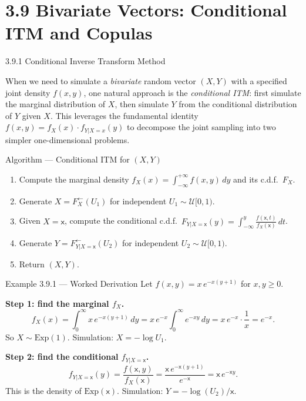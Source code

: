 \documentclass[aspectratio=169,10pt]{beamer}
\newcommand{\UU}{\mathcal{U}}
\begin{document}
\section{3.9 Bivariate Vectors: Conditional ITM and Copulas}

\begin{frame}[allowframebreaks]{3.9.1 Conditional Inverse Transform Method}

When we need to simulate a \emph{bivariate} random vector $(X, Y)$ with a
specified joint density $f(x, y)$, one natural approach is the
\emph{conditional ITM}: first simulate the marginal distribution of $X$,
then simulate $Y$ from the conditional distribution of $Y$ given $X$.
This leverages the fundamental identity
$f(x, y) = f_X(x) \cdot f_{Y|X=x}(y)$ to decompose the joint sampling
into two simpler one-dimensional problems.

\begin{block}{Algorithm --- Conditional ITM for $(X, Y)$}
  \begin{enumerate}
    \item Compute the marginal density $f_X(x) = \int_{-\infty}^{+\infty} f(x,y)\,dy$
          and its c.d.f.\ $F_X$.
    \item Generate $X = F_X^{\leftarrow}(U_1)$ for independent $U_1 \sim \UU[0,1)$.
    \item Given $X = \mathsf{x}$, compute the conditional c.d.f.\
          $F_{Y|X=\mathsf{x}}(y) = \int_{-\infty}^y \frac{f(\mathsf{x},t)}{f_X(\mathsf{x})}\,dt$.
    \item Generate $Y = F_{Y|X=\mathsf{x}}^{\leftarrow}(U_2)$ for independent $U_2 \sim \UU[0,1)$.
    \item Return $(X, Y)$.
  \end{enumerate}
\end{block}

\begin{exampleblock}{Example 3.9.1 --- Worked Derivation}
  Let $f(x, y) = x\,e^{-x(y+1)}$ for $x, y \ge 0$.

  \textbf{Step 1: find the marginal $f_X$.}
  \[
    f_X(x) = \int_0^\infty x\,e^{-x(y+1)}\,dy
    = x\,e^{-x} \int_0^\infty e^{-xy}\,dy
    = x\,e^{-x} \cdot \frac{1}{x} = e^{-x}.
  \]
  So $X \sim \mathrm{Exp}(1)$.  Simulation: $X = -\log U_1$.

  \textbf{Step 2: find the conditional $f_{Y|X=\mathsf{x}}$.}
  \[
    f_{Y|X=\mathsf{x}}(y)
    = \frac{f(\mathsf{x}, y)}{f_X(\mathsf{x})}
    = \frac{\mathsf{x}\,e^{-\mathsf{x}(y+1)}}{e^{-\mathsf{x}}}
    = \mathsf{x}\,e^{-\mathsf{x}y}.
  \]
  This is the density of $\mathrm{Exp}(\mathsf{x})$.  Simulation: $Y = -\log(U_2)/\mathsf{x}$.
\end{exampleblock}


\end{frame}
\end{document}
